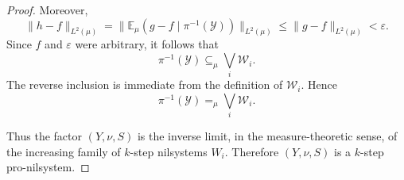 \documentclass[10pt,a4paper]{amsart}
\newcommand\E{\mathbb{E}}
\newcommand\eps{\varepsilon}
\begin{document}
\begin{proof}
    Moreover,
    \[
    \|h-f\|_{L^2(\mu)}
    =\|\E_\mu(g-f\mid \pi^{-1}(\mathcal Y))\|_{L^2(\mu)}
    \leq \|g-f\|_{L^2(\mu)}
    <\eps.
    \]
    Since $f$ and $\eps$ were arbitrary, it follows that
    \[
    \pi^{-1}(\mathcal Y)\subseteq_\mu \bigvee_i \mathcal W_i.
    \]
    The reverse inclusion is immediate from the definition of $\mathcal W_i$.
    Hence
    \[
    \pi^{-1}(\mathcal Y)=_\mu \bigvee_i \mathcal W_i.
    \]

    Thus the factor $(Y,\nu,S)$ is the inverse limit, in the measure-theoretic sense, of the increasing family of $k$-step nilsystems $W_i$.
    Therefore $(Y,\nu,S)$ is a $k$-step pro-nilsystem.
\end{proof}
\end{document}
